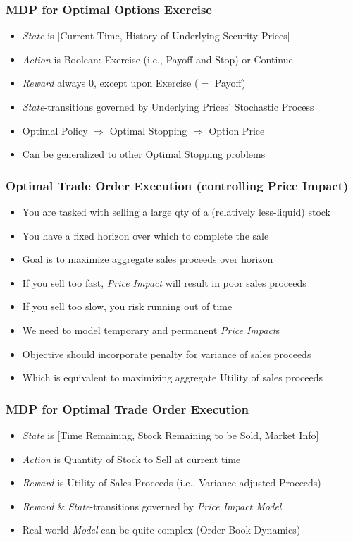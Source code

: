 \documentclass[handout]{beamer}
\begin{document}
\begin{frame}
\frametitle{MDP for Optimal Options Exercise}
\pause
\begin{itemize}[<+->]
\item {\em State} is [Current Time, History of Underlying Security Prices]
\item {\em Action} is Boolean: Exercise (i.e., Payoff and Stop) or Continue
\item {\em Reward} always 0, except upon Exercise ($=$ Payoff)
\item {\em State}-transitions governed by Underlying Prices' Stochastic Process
\item Optimal Policy $\Rightarrow$ Optimal Stopping $\Rightarrow$ Option Price
\item Can be generalized to other Optimal Stopping problems
\end{itemize}
\end{frame}

\begin{frame}
\frametitle{Optimal Trade Order Execution (controlling Price Impact)}
\pause
\begin{itemize}[<+->]
\item You are tasked with selling a large qty of a (relatively less-liquid) stock
\item You have a fixed horizon over which to complete the sale
\item Goal is to maximize aggregate sales proceeds over horizon
\item If you sell too fast, {\em Price Impact} will result in poor sales proceeds
\item If you sell too slow, you risk running out of time
\item We need to model temporary and permanent {\em Price Impact}s
\item Objective should incorporate penalty for variance of sales proceeds
\item Which is equivalent to maximizing aggregate Utility of sales proceeds 
\end{itemize}
\end{frame}

\begin{frame}
\frametitle{MDP for Optimal Trade Order Execution}
\pause
\begin{itemize}[<+->]
\item {\em State} is [Time Remaining, Stock Remaining to be Sold, Market Info]
\item {\em Action} is Quantity of Stock to Sell at current time
\item {\em Reward} is Utility of Sales Proceeds (i.e., Variance-adjusted-Proceeds)
\item {\em Reward} \& {\em State}-transitions governed by {\em Price Impact Model}
\item Real-world {\em Model} can be quite complex (Order Book Dynamics)
\end{itemize}
\end{frame}
\end{document}
